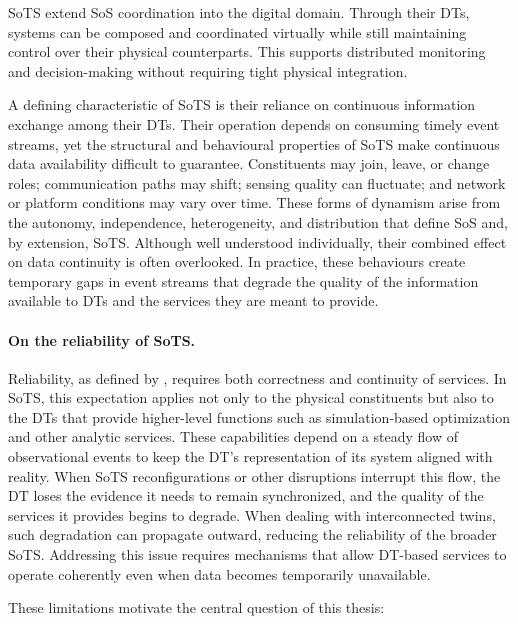 SoTS extend SoS coordination into the digital domain. Through their DTs, systems can be composed and coordinated virtually while still maintaining control over their physical counterparts. This supports distributed monitoring and decision-making without requiring tight physical integration.

A defining characteristic of SoTS is their reliance on continuous information exchange among their DTs. Their operation depends on consuming timely event streams, yet the structural and behavioural properties of SoTS make continuous data availability difficult to guarantee. Constituents may join, leave, or change roles; communication paths may shift; sensing quality can fluctuate; and network or platform conditions may vary over time. These forms of dynamism arise from the autonomy, independence, heterogeneity, and distribution that define SoS and, by extension, SoTS. Although well understood individually, their combined effect on data continuity is often overlooked. In practice, these behaviours create temporary gaps in event streams that degrade the quality of the information available to DTs and the services they are meant to provide.

\paragraph{On the reliability of SoTS.}

Reliability, as defined by \citet{avizienis2004basic}, requires both correctness and continuity of services. In SoTS, this expectation applies not only to the physical constituents but also to the DTs that provide higher-level functions such as simulation-based optimization and other analytic services. These capabilities depend on a steady flow of observational events to keep the DT’s representation of its system aligned with reality. When SoTS reconfigurations or other disruptions interrupt this flow, the DT loses the evidence it needs to remain synchronized, and the quality of the services it provides begins to degrade. When dealing with interconnected twins, such degradation can propagate outward, reducing the reliability of the broader SoTS. Addressing this issue requires mechanisms that allow DT-based services to operate coherently even when data becomes temporarily unavailable.

These limitations motivate the central question of this thesis: 
\textit{}

